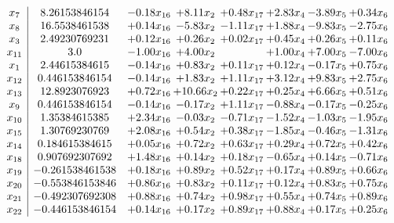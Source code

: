 \documentclass[8pt]{article}
\begin{document}
\[\begin{array}{c| c c@{\hskip 2pt} c@{\hskip 2pt} c@{\hskip 2pt} c@{\hskip 2pt} c@{\hskip 2pt} c@{\hskip 2pt} }
 x_{7}   &  8.26153846154 & -0.18 x_{16} & +  8.11 x_{2} & +  0.48 x_{17} & +  2.83 x_{4} & -3.89 x_{5} & +  0.34 x_{6}\\
 x_{8}   &  16.5538461538 & +  0.14 x_{16} & -5.83 x_{2} & -1.11 x_{17} & +  1.88 x_{4} & -9.83 x_{5} & -2.75 x_{6}\\
 x_{3}   &  2.49230769231 & +  0.12 x_{16} & +  0.26 x_{2} & +  0.02 x_{17} & +  0.45 x_{4} & +  0.26 x_{5} & +  0.11 x_{6}\\
 x_{11}   &  3.0 & -1.00 x_{16} & +  4.00 x_{2} &   & +  1.00 x_{4} & +  7.00 x_{5} & -7.00 x_{6}\\
 x_{1}   &  2.44615384615 & -0.14 x_{16} & +  0.83 x_{2} & +  0.11 x_{17} & +  0.12 x_{4} & -0.17 x_{5} & +  0.75 x_{6}\\
 x_{12}   &  0.446153846154 & -0.14 x_{16} & +  1.83 x_{2} & +  1.11 x_{17} & +  3.12 x_{4} & +  9.83 x_{5} & +  2.75 x_{6}\\
 x_{13}   &  12.8923076923 & +  0.72 x_{16} & + 10.66 x_{2} & +  0.22 x_{17} & +  0.25 x_{4} & +  6.66 x_{5} & +  0.51 x_{6}\\
 x_{9}   &  0.446153846154 & -0.14 x_{16} & -0.17 x_{2} & +  1.11 x_{17} & -0.88 x_{4} & -0.17 x_{5} & -0.25 x_{6}\\
 x_{10}   &  1.35384615385 & +  2.34 x_{16} & -0.03 x_{2} & -0.71 x_{17} & -1.52 x_{4} & -1.03 x_{5} & -1.95 x_{6}\\
 x_{15}   &  1.30769230769 & +  2.08 x_{16} & +  0.54 x_{2} & +  0.38 x_{17} & -1.85 x_{4} & -0.46 x_{5} & -1.31 x_{6}\\
 x_{14}   &  0.184615384615 & +  0.05 x_{16} & +  0.72 x_{2} & +  0.63 x_{17} & +  0.29 x_{4} & +  0.72 x_{5} & +  0.42 x_{6}\\
 x_{18}   &  0.907692307692 & +  1.48 x_{16} & +  0.14 x_{2} & +  0.18 x_{17} & -0.65 x_{4} & +  0.14 x_{5} & -0.71 x_{6}\\
 x_{19}   &  -0.261538461538 & +  0.18 x_{16} & +  0.89 x_{2} & +  0.52 x_{17} & +  0.17 x_{4} & +  0.89 x_{5} & +  0.66 x_{6}\\
 x_{20}   &  -0.553846153846 & +  0.86 x_{16} & +  0.83 x_{2} & +  0.11 x_{17} & +  0.12 x_{4} & +  0.83 x_{5} & +  0.75 x_{6}\\
 x_{21}   &  -0.492307692308 & +  0.88 x_{16} & +  0.74 x_{2} & +  0.98 x_{17} & +  0.55 x_{4} & +  0.74 x_{5} & +  0.89 x_{6}\\
 x_{22}   &  -0.446153846154 & +  0.14 x_{16} & +  0.17 x_{2} & +  0.89 x_{17} & +  0.88 x_{4} & +  0.17 x_{5} & +  0.25 x_{6}\\

\end{array}\]
\end{document}
